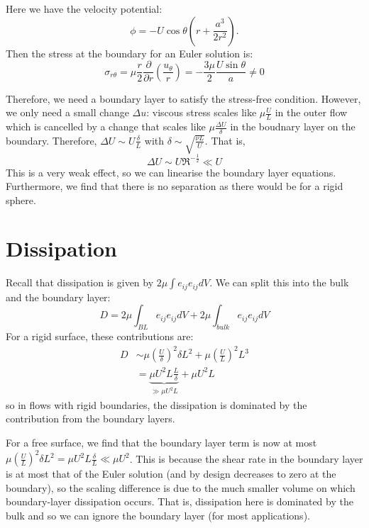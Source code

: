 \documentclass[../Main.tex]{subfiles}
\begin{document}
\begin{example}
    Here we have the velocity potential:
    \begin{equation*}
        \phi = -U\cos\theta \left(r + \frac{a^3}{2r^2}\right).
    \end{equation*}
    Then the stress at the boundary for an Euler solution is:
    \begin{equation*}
        \sigma_{r\theta} = \mu \frac r 2 \frac{\partial }{\partial r} \left(\frac{u_\theta}{r}\right) = -\frac{3\mu}2 \frac{U\sin \theta}{a} \neq 0
    \end{equation*}
    
    Therefore, we need a boundary layer to satisfy the stress-free condition. However, we only need a small change $\Delta u$: viscous stress scales like $\mu \frac U L$ in the outer flow which is cancelled by a change that scales like $\mu \frac{\Delta U}{\delta}$ in the boudnary layer on the boundary. Therefore, $\Delta U \sim U \frac{\delta}{L}$ with $\delta \sim \sqrt{\frac{\nu L}{U}}$. That is,
    \begin{equation*}
        \Delta U \sim U \Re^{-\frac12} \ll U
    \end{equation*}
    This is a very weak effect, so we can linearise the boundary layer equations. Furthermore, we find that there is no separation as there would be for a rigid sphere.
\end{example}
\section{Dissipation}
Recall that dissipation is given by $2\mu \int e_{ij}e_{ij} dV$. We can split this into the bulk and the boundary layer:
\begin{equation*}
    D = 2\mu \int_{BL} e_{ij} e_{ij} dV + 2\mu \int_{bulk} e_{ij} e_{ij} dV
\end{equation*}
For a rigid surface, these contributions are:
\begin{align*}
    D &\sim \mu \left(\frac U \delta\right)^2 \delta L^2 + \mu \left(\frac U L\right)^2 L^3 \\
    &= \underbrace{\mu U^2 L \frac{L}{\delta}}_{\gg \mu U^2 L} + \mu U^2 L
\end{align*}
so in flows with rigid boundaries, the dissipation is dominated by the contribution from the boundary layers.

For a free surface, we find that the boundary layer term is now at most $\mu \left(\frac U L\right)^2 \delta L^2 = \mu U^2 L \frac{\delta}{L} \ll \mu U^2$. This is because the shear rate in the boundary layer is at most that of the Euler solution (and by design decreases to zero at the boundary), so the scaling difference is due to the much smaller volume on which boundary-layer dissipation occurs. That is, dissipation here is dominated by the bulk and so we can ignore the boundary layer (for most applications).
\end{document}
